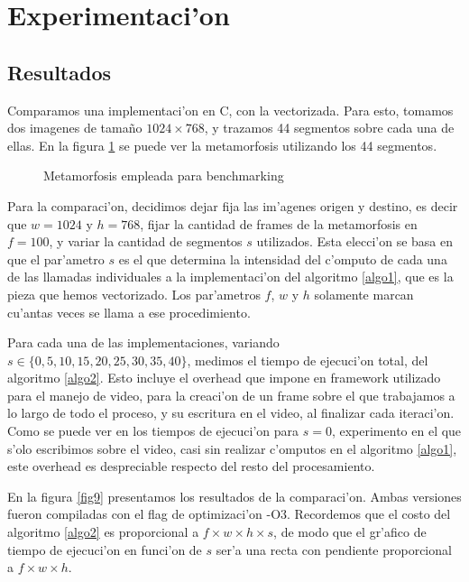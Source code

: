 \section{Experimentaci'on}

\subsection{Resultados}

Comparamos una implementaci'on en C, con la vectorizada. Para esto, tomamos dos imagenes de tama\~{n}o $1024 \times 768$, y trazamos 44 segmentos sobre cada una de ellas. En la figura \ref{fig8} se puede ver la metamorfosis utilizando los 44 segmentos.

\begin{figure}[H]
	\begin{center}
	\end{center}		
	\caption{Metamorfosis empleada para benchmarking}
	\label{fig8}
\end{figure}

Para la comparaci'on, decidimos dejar fija las im'agenes origen y destino, es decir que $w = 1024$ y $h = 768$, fijar la cantidad de frames de la metamorfosis en $f = 100$, y variar la cantidad de segmentos $s$ utilizados. Esta elecci'on se basa en que el par'ametro $s$ es el que determina la intensidad del c'omputo de cada una de las llamadas individuales a la implementaci'on del algoritmo \ref{algo1}, que es la pieza que hemos vectorizado. Los par'ametros $f$, $w$ y $h$ solamente marcan cu'antas veces se llama a ese procedimiento.

Para cada una de las implementaciones, variando $s \in \{0, 5, 10, 15, 20, 25, 30, 35, 40\}$, medimos el tiempo de ejecuci'on total, del algoritmo \ref{algo2}. Esto incluye el overhead que impone en framework utilizado para el manejo de video, para la creaci'on de un frame sobre el que trabajamos a lo largo de todo el proceso, y su escritura en el video, al finalizar cada iteraci'on. Como se puede ver en los tiempos de ejecuci'on para $s = 0$, experimento en el que s'olo escribimos sobre el video, casi sin realizar c'omputos en el algoritmo \ref{algo1}, este overhead es despreciable respecto del resto del procesamiento.

En la figura \ref{fig9} presentamos los resultados de la comparaci'on. Ambas versiones fueron compiladas con el flag de optimizaci'on -O3. Recordemos que el costo del algoritmo \ref{algo2} es proporcional a $f \times w \times h \times s$, de modo que el gr'afico de tiempo de ejecuci'on en funci'on de $s$ ser'a una recta con pendiente proporcional a $f \times w \times h$.

